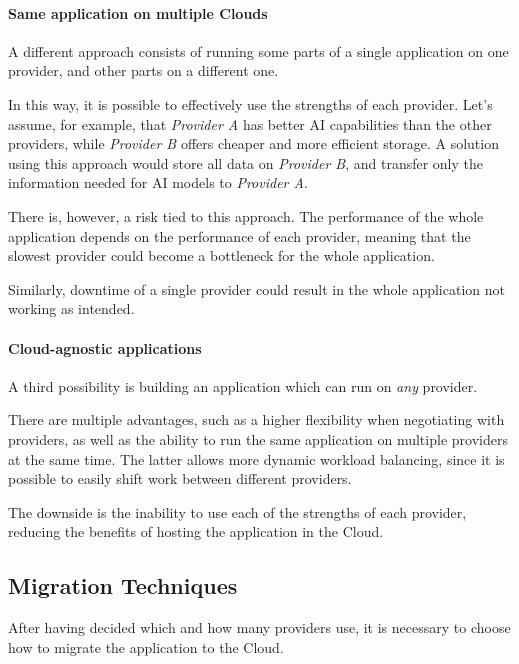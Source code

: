         \paragraph{Same application on multiple Clouds}
            A different approach consists of running some parts of a single application on one provider, and other parts on a different one.
            
            In this way, it is possible to effectively use the strengths of each provider.
            Let's assume, for example, that \textit{Provider A} has better AI capabilities than the other providers, while \textit{Provider B} offers cheaper and more efficient storage.
            A solution using this approach would store all data on \textit{Provider B}, and transfer only the information needed for AI models to \textit{Provider A}.
            
            There is, however, a risk tied to this approach.
            The performance of the whole application depends on the performance of each provider, meaning that the slowest provider could become a bottleneck for the whole application.
            
            Similarly, downtime of a single provider could result in the whole application not working as intended.
            
        \paragraph{Cloud-agnostic applications}
            A third possibility is building an application which can run on \textit{any} provider.
            
            There are multiple advantages, such as a higher flexibility when negotiating with providers, as well as the ability to run the same application on multiple providers at the same time.
            The latter allows more dynamic workload balancing, since it is possible to easily shift work between different providers.
            
            The downside is the inability to use each of the strengths of each provider, reducing the benefits of hosting the application in the Cloud.
            
\subsection{Migration Techniques}
    After having decided which and how many providers use, it is necessary to choose how to migrate the application to the Cloud.
    
